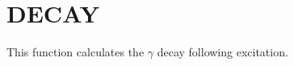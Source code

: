 \section{DECAY}
\label{sect:decay}

\noindent This function calculates the $\gamma$ decay following excitation.\\

